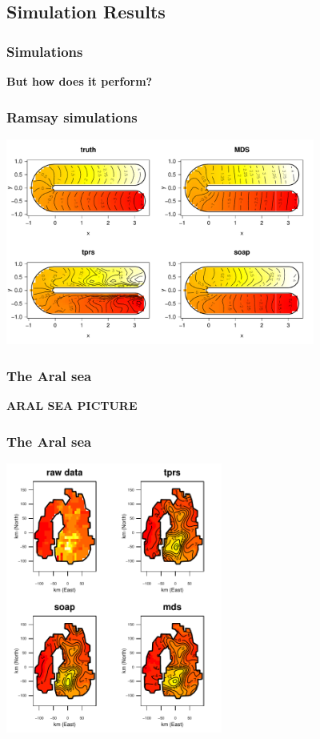 \documentclass[ignorenonframetext]{beamer} %
\newcommand{\bc}{\begin{center}}
\newcommand{\ec}{\end{center}}
\begin{document}
\subsection{Simulation Results}

\begin{frame}
	\frametitle{Simulations}
	\bc \textbf{But how does it perform?}\ec
\end{frame}


\begin{frame}
	\frametitle{Ramsay simulations}
            \centering
              \includegraphics[width=4in]{figs/ramsay-low.pdf}\\
\end{frame}

\begin{frame}
	\frametitle{The Aral sea}
	\textbf{ARAL SEA PICTURE}
\end{frame}

\begin{frame}
	\frametitle{The Aral sea}
            \centering
              \includegraphics[height=3.5in]{figs/aral-fit.pdf}\\
\end{frame}
\end{document}
